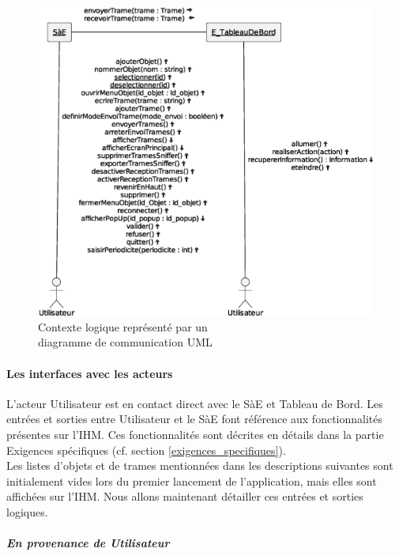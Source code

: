 \begin{figure}[ht] 
    \centering
    \includegraphics[width=12cm]{../schemas/contexte_log}
    \caption{Contexte logique représenté par un\\diagramme de communication UML}
    \label{schema_contexte_log}
\end{figure}

\newpage

\paragraph{Les interfaces avec les acteurs} 
L'acteur Utilisateur est en contact direct avec le SàE et Tableau de Bord. Les entrées et sorties entre Utilisateur et le SàE font référence aux fonctionnalités présentes sur l'IHM. Ces fonctionnalités sont décrites en détails dans la partie Exigences spécifiques (cf. section \ref{exigences_specifiques}). \\

Les listes d'objets et de trames mentionnées dans les descriptions suivantes sont initialement vides lors du premier lancement de l'application, mais elles sont affichées sur l'IHM. Nous allons maintenant détailler ces entrées et sorties logiques.

\vspace{-1cm}
\subparagraph{En provenance de Utilisateur}
\vspace{1cm}
\mbox{}\\

